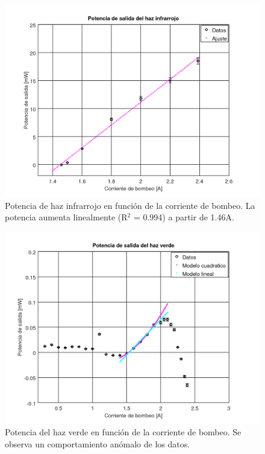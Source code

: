 \documentclass[10pt, a4paper]{article}%
\begin{document}
\begin{multicols}{2}
\begin{figure}[H]
    \centering
    \includegraphics[scale=0.4]{Graficos/pot_infrarrojo.png}
    \caption{Potencia de haz infrarrojo en función de la corriente de bombeo. La potencia aumenta linealmente (R$^2$ = 0.994) a partir de 1.46A.}
    \label{potrojo}
\end{figure}
\begin{figure}[H]
    \centering
    \includegraphics[scale=0.4]{Graficos/pot_verde1.png}
    \caption{Potencia del haz verde en función de la corriente de bombeo. Se observa un comportamiento anómalo de los datos.}
    \label{potverde}
\end{figure}





\end{multicols}
\end{document}
